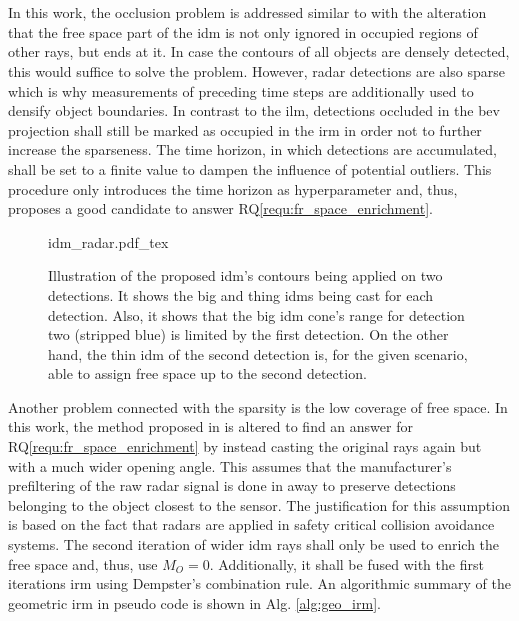 \\\\
In this work, the occlusion problem is addressed similar to \cite{werber2015automotive} with the alteration that the free space part of the \gls{idm} is not only ignored in occupied regions of other rays, but ends at it. In case the contours of all objects are densely detected, this would suffice to solve the problem. However, radar detections are also sparse which is why measurements of preceding time steps are additionally used to densify object boundaries. In contrast to the \gls{ilm}, detections occluded in the \gls{bev} projection shall still be marked as occupied in the \gls{irm} in order not to further increase the sparseness. The time horizon, in which detections are accumulated, shall be set to a finite value to dampen the influence of potential outliers. This procedure only introduces the time horizon as hyperparameter and, thus, proposes a good candidate to answer RQ\ref{requ:fr_space_enrichment}.
\begin{figure}
	\begin{center}
		{idm_radar.pdf_tex}
		\caption{\label{idm_radar}Illustration of the proposed \gls{idm}'s contours being applied on two detections. It shows the big and thing \gls{idm}s being cast for each detection. Also, it shows that the big \gls{idm} cone's range for detection two (stripped blue) is limited by the first detection. On the other hand, the thin \gls{idm} of the second detection is, for the given scenario, able to assign free space up to the second detection.}
	\end{center}
\end{figure}
Another problem connected with the sparsity is the low coverage of free space. In this work, the method proposed in \cite{prophet2018adaptions} is altered to find an answer for RQ\ref{requ:fr_space_enrichment} by instead casting the original rays again but with a much wider opening angle. This assumes that the manufacturer's prefiltering of the raw radar signal is done in away to preserve detections belonging to the object closest to the sensor. The justification for this assumption is based on the fact that radars are applied in safety critical collision avoidance systems. The second iteration of wider \gls{idm} rays shall only be used to enrich the free space and, thus, use $M_O = 0$. Additionally, it shall be fused with the first iterations \gls{irm} using Dempster's combination rule. An algorithmic summary of the geometric \gls{irm} in pseudo code is shown in Alg. \ref{alg:geo_irm}.
